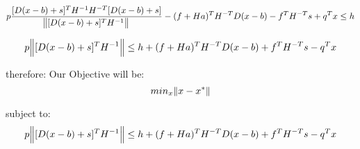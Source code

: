 \documentclass{article}
\begin{document}
\begin{equation}
p \frac{[D (x-b)+s]^T  H^{-1} H^{-T} [D (x-b)+s ]}{\norm{[D (x-b)+s]^T  H^{-1}}  }-(f+H a)^T H^{-T} D (x-b) - f^T H^{-T} s+ q^T x \leq h
\end{equation}


\begin{equation}
p \norm{[D (x-b)+s]^T  H^{-1}}   \leq h +(f+H a)^T H^{-T} D (x-b) + f^T H^{-T} s - q^T x
\end{equation}

therefore:
Our Objective will be:
\begin{equation}
min_{x}  \norm{x-x^*}
\end{equation}

subject to:
\begin{equation}
p \norm{[D (x-b)+s]^T  H^{-1}}   \leq h +(f+H a)^T H^{-T} D (x-b) + f^T H^{-T} s - q^T x
\end{equation}
\end{document}
